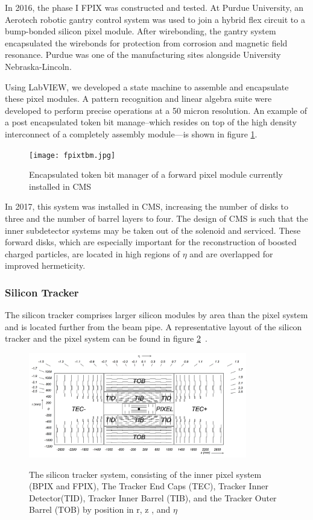 In 2016, the phase I FPIX was constructed and tested. At Purdue University, an Aerotech robotic gantry control system was used to join a hybrid flex circuit to a bump-bonded silicon pixel module. After wirebonding, the gantry system encapsulated the wirebonds for protection from corrosion and magnetic field resonance. Purdue was one of the manufacturing sites alongside University Nebraska-Lincoln. 

Using LabVIEW, we developed a state machine to assemble and encapsulate these pixel modules. A pattern recognition and linear algebra suite were developed to perform precise operations at a 50 micron resolution. An example of a post encapsulated token bit manage--which resides on top of the high density interconnect of a completely assembly module---is shown in figure \ref{fig:tbm}.

\begin{figure}[ht!b]
\label{fig:tbm} 
    \centering
  \texttt{[image: fpixtbm.jpg]}
    \caption{Encapsulated token bit manager of a forward pixel module currently installed in CMS}
\end{figure}


In 2017, this system was installed in CMS, increasing the number of disks to three and the number of barrel layers to four.  The design of CMS is such that the inner subdetector systems may be taken out of the solenoid and serviced.  
These forward disks, which are especially important for the reconstruction of boosted charged particles, are located in high regions of $\eta$ and are overlapped for improved hermeticity.  


\subsubsection{Silicon Tracker}
The silicon tracker comprises larger silicon modules by area than the pixel system and is located further from the beam pipe. A representative layout of the silicon tracker and the pixel system can be found in figure \ref{fig:tracker}~\cite{Chatrchyan:2008zzk}. 

\begin{figure}[ht!b]
\label{fig:tracker}
  \centering
  \includegraphics[width=0.85\textwidth]{figures/silicon/SiliconTracker.png}\\
    \caption{ The silicon tracker system, consisting of the inner pixel system (BPIX and FPIX), The Tracker End Caps (TEC), Tracker Inner Detector(TID), Tracker Inner Barrel (TIB), and the Tracker Outer Barrel (TOB) by position in r, z , and $\eta$ ~\cite{Chatrchyan:2008zzk}}
\end{figure}



